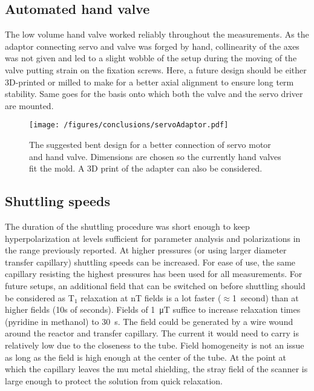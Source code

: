         \subsection{Automated hand valve}
            The low volume hand valve worked reliably throughout the measurements. As the adaptor connecting servo and valve was forged by hand, collinearity of the axes was not given and led to a slight wobble of the setup during the moving of the valve putting strain on the fixation screws. Here, a future design should be either 3D-printed or milled to make for a better axial alignment to ensure long term stability. Same goes for the basis onto which both the valve and the servo driver are mounted.
            \begin{figure}
                \centering
                \texttt{[image: /figures/conclusions/servoAdaptor.pdf]}
                \label{fig:conclusions:servoAdaptor}
                \caption[Servo adaptor]{The suggested bent design for a better connection of servo motor and hand valve. Dimensions are chosen so the currently hand valves fit the mold. A 3D print of the adapter can also be considered.}
            \end{figure}
        \subsection{Shuttling speeds}
        The duration of the shuttling procedure was short enough to keep hyperpolarization at levels sufficient for parameter analysis and polarizations in the range previously reported. At higher pressures (or using larger diameter transfer capillary) shuttling speeds can be increased. For ease of use, the same capillary resisting the highest pressures has been used for all measurements. For future setups, an additional field that can be switched on before shuttling should be considered as T$_1$ relaxation at \si{\nano\tesla} fields is a lot faster ($\approx$\SI{1}{second}) than at higher fields (10s of seconds). Fields of \SI{1}{\micro\tesla} suffice to increase relaxation times (pyridine in methanol) to \SI{30}{\second}. The field could be generated by a wire wound around the reactor and transfer capillary. The current it would need to carry is relatively low due to the closeness to the tube. Field homogeneity is not an issue as long as the field is high enough at the center of the tube. At the point at which the capillary leaves the mu metal shielding, the stray field of the scanner is large enough to protect the solution from quick relaxation.
